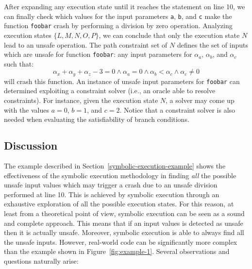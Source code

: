 \documentclass[10pt, a4paper]{article}
\begin{document}
After expanding any execution state until it reaches the statement on line 10, we can finally check which values for the input parameters {\tt a}, {\tt b}, and {\tt c} make the function {\tt foobar} crash by performing a division by zero operation. Analyzing execution states $\{L, M, N, O, P\}$, we can conclude that only the execution state $N$ lead to an unsafe operation. The path constraint set of $N$ defines the set of inputs which are unsafe for function {\tt foobar}: any input parameters for $\alpha_a$, $\alpha_b$, and $\alpha_c$ such that:
 \[ \alpha_x + \alpha_y + \alpha_z - 3 = 0 \wedge \alpha_a = 0 \wedge \alpha_b < \alpha_c \wedge \alpha_c \neq 0 \]
will crash this function. An instance of unsafe input parameters for {\tt foobar} can determined exploiting a constraint solver (i.e., an oracle able to resolve constraints). For instance, given the execution state $N$, a solver may come up with the values $a = 0$, $b = 1$, and $c = 2$. Notice that a constraint solver is also needed when evaluating the satisfiability of branch conditions. 

\subsection{Discussion}
\label{example-discussion}

The example described in Section~\ref{symbolic-execution-example} shows the effectiveness of the symbolic execution methodology in finding {\em all} the possible unsafe input values which may trigger a crash due to an unsafe division performed at line 10. This is achieved by symbolic execution through an exhaustive exploration of all the possible execution states. For this reason, at least from a theoretical point of view, symbolic execution can be seen as a sound and complete approach. This means that if an input values is detected as unsafe then it is actually unsafe. Moreover, symbolic execution is able to always find all the unsafe inputs. However, real-world code can be significantly more complex than the example shown in Figure~\ref{fig:example-1}. Several observations and questions naturally arise:
\end{document}
